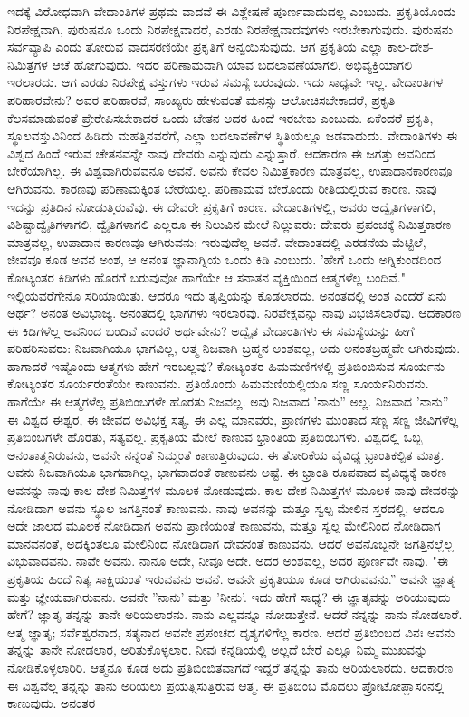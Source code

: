 ಇದಕ್ಕೆ ವಿರೋಧವಾಗಿ ವೇದಾಂತಿಗಳ ಪ್ರಥಮ ವಾದವೆ ಈ ವಿಶ್ಲೇಷಣೆ ಪೂರ್ಣವಾದುದಲ್ಲ ಎಂಬುದು. ಪ್ರಕೃತಿಯೊಂದು ನಿರಪೇಕ್ಷವಾಗಿ, ಪುರುಷನೂ ಒಂದು ನಿರಪೇಕ್ಷವಾದರೆ, ಎರಡು ನಿರಪೇಕ್ಷವಾದವುಗಳು ಇರಬೇಕಾಗುವುದು. ಪುರುಷನು ಸರ್ವವ್ಯಾಪಿ ಎಂದು ತೋರುವ ವಾದಸರಣಿಯೇ ಪ್ರಕೃತಿಗೆ ಅನ್ವಯಿಸುವುದು. ಆಗ ಪ್ರಕೃತಿಯ ಎಲ್ಲಾ ಕಾಲ-ದೇಶ-ನಿಮಿತ್ತಗಳ ಆಚೆ ಹೋಗುವುದು. ಇದರ ಪರಿಣಾಮವಾಗಿ ಯಾವ ಬದಲಾವಣೆಯಾಗಲಿ, ಅಭಿವ್ಯಕ್ತಿಯಾಗಲಿ ಇರಲಾರದು. ಆಗ ಎರಡು ನಿರಪೇಕ್ಷ ವಸ್ತುಗಳು ಇರುವ ಸಮಸ್ಯೆ ಬರುವುದು. ಇದು ಸಾಧ್ಯವೇ ಇಲ್ಲ. ವೇದಾಂತಿಗಳ ಪರಿಹಾರವೇನು? ಅವರ ಪರಿಹಾರವೆ, ಸಾಂಖ್ಯರು ಹೇಳುವಂತೆ ಮನಸ್ಸು ಆಲೋಚಿಸಬೇಕಾದರೆ, ಪ್ರಕೃತಿ ಕೆಲಸಮಾಡುವಂತೆ ಪ್ರೇರೇಪಿಸಬೇಕಾದರೆ ಒಂದು ಚೇತನ ಅದರ ಹಿಂದೆ ಇರಬೇಕು ಎಂಬುದು. ಏಕೆಂದರೆ ಪ್ರಕೃತಿ, ಸ್ಥೂಲವಸ್ತುವಿನಿಂದ ಹಿಡಿದು ಮಹತ್ತಿನವರೆಗೆ, ಎಲ್ಲಾ ಬದಲಾವಣೆಗಳ ಸ್ಥಿತಿಯಲ್ಲೂ ಜಡವಾದುದು. ವೇದಾಂತಿಗಳು ಈ ವಿಶ್ವದ ಹಿಂದೆ ಇರುವ ಚೇತನವನ್ನೇ ನಾವು ದೇವರು ಎನ್ನುವುದು ಎನ್ನುತ್ತಾರೆ. ಆದಕಾರಣ ಈ ಜಗತ್ತು ಅವನಿಂದ ಬೇರೆಯಾಗಿಲ್ಲ. ಈ ವಿಶ್ವವಾಗಿರುವವನೂ ಅವನೆ. ಅವನು ಕೇವಲ ನಿಮಿತ್ತಕಾರಣ ಮಾತ್ರವಲ್ಲ, ಉಪಾದಾನಕಾರಣವೂ ಆಗಿರುವನು. ಕಾರಣವು ಪರಿಣಾಮಕ್ಕಿಂತ ಬೇರೆಯಲ್ಲ. ಪರಿಣಾಮವೆ ಬೇರೊಂದು ರೀತಿಯಲ್ಲಿರುವ ಕಾರಣ. ನಾವು ಇದನ್ನು ಪ್ರತಿದಿನ ನೋಡುತ್ತಿರುವೆವು. ಈ ದೇವರೇ ಪ್ರಕೃತಿಗೆ ಕಾರಣ. ವೇದಾಂತಿಗಳಲ್ಲಿ, ಅವರು ಅದ್ವೈತಿಗಳಾಗಲಿ, ವಿಶಿಷ್ಟಾದ್ವೈತಿಗಳಾಗಲಿ, ದ್ವೈತಿಗಳಾಗಲಿ ಎಲ್ಲರೂ ಈ ನಿಲುವಿನ ಮೇಲೆ ನಿಲ್ಲುವರು: ದೇವರು ಪ್ರಪಂಚಕ್ಕೆ ನಿಮಿತ್ತಕಾರಣ ಮಾತ್ರವಲ್ಲ, ಉಪಾದಾನ ಕಾರಣವೂ ಆಗಿರುವನು; ಇರುವುದೆಲ್ಲ ಅವನೆ. ವೇದಾಂತದಲ್ಲಿ ಎರಡನೆಯ ಮೆಟ್ಟಿಲೆ, ಜೀವವೂ ಕೂಡ ಅವನ ಅಂಶ, ಆ ಅನಂತ ಜ್ಞಾನಾಗ್ನಿಯ ಒಂದು ಕಿಡಿ ಎಂಬುದು. 'ಹೇಗೆ ಒಂದು ಅಗ್ನಿಕುಂಡದಿಂದ ಕೋಟ್ಯಂತರ ಕಿಡಿಗಳು ಹೊರಗೆ ಬರುವುವೋ ಹಾಗೆಯೇ ಆ ಸನಾತನ ವ್ಯಕ್ತಿಯಿಂದ ಆತ್ಮಗಳೆಲ್ಲ ಬಂದಿವೆ." ಇಲ್ಲಿಯವರೆಗೇನೊ ಸರಿಯಾಯಿತು. ಆದರೂ ಇದು ತೃಪ್ತಿಯನ್ನು ಕೊಡಲಾರದು. ಅನಂತದಲ್ಲಿ ಅಂಶ ಎಂದರೆ ಏನು ಅರ್ಥ? ಅನಂತ ಅವಿಭಾಜ್ಯ. ಅನಂತದಲ್ಲಿ ಭಾಗಗಳು ಇರಲಾರವು. ನಿರಪೇಕ್ಷವನ್ನು ನಾವು ವಿಭಜಿಸಲಾರೆವು. ಆದಕಾರಣ ಈ ಕಿಡಿಗಳೆಲ್ಲ ಅವನಿಂದ ಬಂದಿವೆ ಎಂದರೆ ಅರ್ಥವೇನು? ಅದ್ವೈತ ವೇದಾಂತಿಗಳು ಈ ಸಮಸ್ಯೆಯನ್ನು ಹೀಗೆ ಪರಿಹರಿಸುವರು: ನಿಜವಾಗಿಯೂ ಭಾಗವಿಲ್ಲ, ಆತ್ಮ ನಿಜವಾಗಿ ಬ್ರಹ್ಮನ ಅಂಶವಲ್ಲ, ಅದು ಅನಂತಬ್ರಹ್ಮವೇ ಆಗಿರುವುದು. ಹಾಗಾದರೆ ಇಷ್ಟೊಂದು ಆತ್ಮಗಳು ಹೇಗೆ ಇರಬಲ್ಲವು? ಕೋಟ್ಯಂತರ ಹಿಮಮಣಿಗಳಲ್ಲಿ ಪ್ರತಿಬಿಂಬಿಸುವ ಸೂರ್ಯನು ಕೋಟ್ಯಂತರ ಸೂರ್ಯರಂತೆಯೇ ಕಾಣುವನು. ಪ್ರತಿಯೊಂದು ಹಿಮಮಣಿಯಲ್ಲಿಯೂ ಸಣ್ಣ ಸೂರ್ಯನಿರುವನು. ಹಾಗೆಯೇ ಈ ಆತ್ಮಗಳೆಲ್ಲ ಪ್ರತಿಬಿಂಬಗಳೇ ಹೊರತು ನಿಜವಲ್ಲ. ಅವು ನಿಜವಾದ 'ನಾನು'' ಅಲ್ಲ. ನಿಜವಾದ 'ನಾನು'' ಈ ವಿಶ್ವದ ಈಶ್ವರ, ಈ ಜೀವದ ಅವಿಭಕ್ತ ಸತ್ಯ. ಈ ಎಲ್ಲ ಮಾನವರು, ಪ್ರಾಣಿಗಳು ಮುಂತಾದ ಸಣ್ಣ ಸಣ್ಣ ಜೀವಿಗಳೆಲ್ಲ ಪ್ರತಿಬಿಂಬಗಳೇ ಹೊರತು, ಸತ್ಯವಲ್ಲ. ಪ್ರಕೃತಿಯ ಮೇಲೆ ಕಾಣುವ ಭ್ರಾಂತಿಯ ಪ್ರತಿಬಿಂಬಗಳು. ವಿಶ್ವದಲ್ಲಿ ಒಬ್ಬ ಅನಂತಾತ್ಮನಿರುವನು, ಅವನೇ ನನ್ನಂತೆ ನಿಮ್ಮಂತೆ ಕಾಣುತ್ತಿರುವುದು. ಈ ತೋರಿಕೆಯ ವೈವಿಧ್ಯ ಭ್ರಾಂತಿಕಲ್ಪಿತ ಮಾತ್ರ. ಅವನು ನಿಜವಾಗಿಯೂ ಭಾಗವಾಗಿಲ್ಲ, ಭಾಗವಾದಂತೆ ಕಾಣುವನು ಅಷ್ಟೆ. ಈ ಭ್ರಾಂತಿ ರೂಪವಾದ ವೈವಿಧ್ಯಕ್ಕೆ ಕಾರಣ ಅವನನ್ನು ನಾವು ಕಾಲ-ದೇಶ-ನಿಮಿತ್ತಗಳ ಮೂಲಕ ನೋಡುವುದು. ಕಾಲ-ದೇಶ-ನಿಮಿತ್ತಗಳ ಮೂಲಕ ನಾವು ದೇವರನ್ನು ನೋಡಿದಾಗ ಅವನು ಸ್ಥೂಲ ಜಗತ್ತಿನಂತೆ ಕಾಣುವನು. ನಾವು ಅವನನ್ನು ಮತ್ತೂ ಸ್ವಲ್ಪ ಮೇಲಿನ ಸ್ತರದಲ್ಲಿ, ಆದರೂ ಅದೇ ಜಾಲದ ಮೂಲಕ ನೋಡಿದಾಗ ಅವನು ಪ್ರಾಣಿಯಂತೆ ಕಾಣುವನು, ಮತ್ತೂ ಸ್ವಲ್ಪ ಮೇಲಿನಿಂದ ನೋಡಿದಾಗ ಮಾನವನಂತೆ, ಅದಕ್ಕಿಂತಲೂ ಮೇಲಿನಿಂದ ನೋಡಿದಾಗ ದೇವನಂತೆ ಕಾಣುವನು. ಆದರೆ ಅವನೊಬ್ಬನೇ ಜಗತ್ತಿನಲ್ಲೆಲ್ಲ ವಿಭುವಾದವನು. ನಾವೇ ಅವನು. ನಾನೂ ಅದೇ, ನೀವೂ ಅದೇ. ಅದರ ಅಂಶವಲ್ಲ, ಅದರ ಪೂರ್ಣವೇ ನಾವು. "ಈ ಪ್ರಕೃತಿಯ ಹಿಂದೆ ನಿತ್ಯ ಸಾಕ್ಷಿಯಂತೆ ಇರುವವನು ಅವನೆ. ಅವನೇ ಪ್ರಕೃತಿಯೂ ಕೂಡ ಆಗಿರುವವನು.” ಅವನೇ ಜ್ಞಾತೃ ಮತ್ತು ಜ್ಞೇಯವಾಗಿರುವನು. ಅವನೇ ''ನಾನು' ಮತ್ತು 'ನೀನು'. ಇದು ಹೇಗೆ ಸಾಧ್ಯ? ಈ ಜ್ಞಾತೃವನ್ನು ಅರಿಯುವುದು ಹೇಗೆ? ಜ್ಞಾತೃ ತನ್ನನ್ನು ತಾನೇ ಅರಿಯಲಾರನು. ನಾನು ಎಲ್ಲವನ್ನೂ ನೋಡುತ್ತೇನೆ. ಆದರೆ ನನ್ನನ್ನು ನಾನು ನೋಡಲಾರೆ. ಆತ್ಮ ಜ್ಞಾತೃ; ಸರ್ವೆಶ್ವರನಾದ, ಸತ್ಯನಾದ ಅವನೇ ಪ್ರಪಂಚದ ದೃಶ್ಯಗಳಿಗೆಲ್ಲ ಕಾರಣ. ಆದರೆ ಪ್ರತಿಬಿಂಬದ ವಿನಃ ಅವನು ತನ್ನನ್ನು ತಾನೇ ನೋಡಲಾರ, ಅರಿತುಕೊಳ್ಳಲಾರ. ನೀವು ಕನ್ನಡಿಯಲ್ಲಿ ಅಲ್ಲದೆ ಬೇರೆ ಎಲ್ಲೂ ನಿಮ್ಮ ಮುಖವನ್ನು ನೋಡಿಕೊಳ್ಳಲಾರಿರಿ. ಆತ್ಮನೂ ಕೂಡ ಅದು ಪ್ರತಿಬಿಂಬಿತವಾಗದೆ ಇದ್ದರೆ ತನ್ನನ್ನು ತಾನು ಅರಿಯಲಾರದು. ಆದಕಾರಣ ಈ ವಿಶ್ವವೆಲ್ಲ ತನ್ನನ್ನು ತಾನು ಅರಿಯಲು ಪ್ರಯತ್ನಿಸುತ್ತಿರುವ ಆತ್ಮ. ಈ ಪ್ರತಿಬಿಂಬ ಮೊದಲು ಪ್ರೋಟೋಪ್ಲಾಸಂನಲ್ಲಿ ಕಾಣುವುದು. ಅನಂತರ 